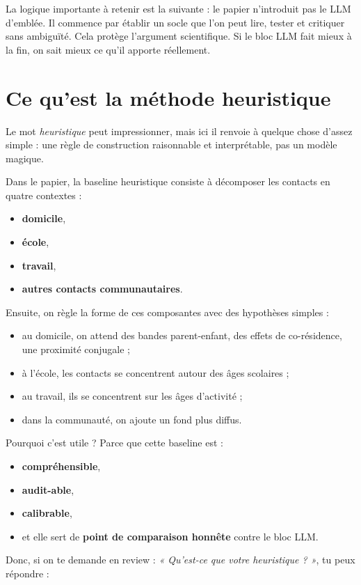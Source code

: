 \documentclass[11pt,a4paper]{article}
\begin{document}
La logique importante à retenir est la suivante : le papier n'introduit pas le LLM d'emblée. Il commence par établir un socle que l'on peut lire, tester et critiquer sans ambiguïté. Cela protège l'argument scientifique. Si le bloc LLM fait mieux à la fin, on sait mieux ce qu'il apporte réellement.

\section{Ce qu'est la méthode heuristique}

Le mot \emph{heuristique} peut impressionner, mais ici il renvoie à quelque chose d'assez simple : une règle de construction raisonnable et interprétable, pas un modèle magique.

Dans le papier, la baseline heuristique consiste à décomposer les contacts en quatre contextes :
\begin{itemize}
\item \textbf{domicile},
\item \textbf{école},
\item \textbf{travail},
\item \textbf{autres contacts communautaires}.
\end{itemize}

Ensuite, on règle la forme de ces composantes avec des hypothèses simples :
\begin{itemize}
\item au domicile, on attend des bandes parent-enfant, des effets de co-résidence, une proximité conjugale ;
\item à l'école, les contacts se concentrent autour des âges scolaires ;
\item au travail, ils se concentrent sur les âges d'activité ;
\item dans la communauté, on ajoute un fond plus diffus.
\end{itemize}

Pourquoi c'est utile ? Parce que cette baseline est :
\begin{itemize}
\item \textbf{compréhensible},
\item \textbf{audit-able},
\item \textbf{calibrable},
\item et elle sert de \textbf{point de comparaison honnête} contre le bloc LLM.
\end{itemize}

Donc, si on te demande en review : \emph{« Qu'est-ce que votre heuristique ? »}, tu peux répondre :
\end{document}

